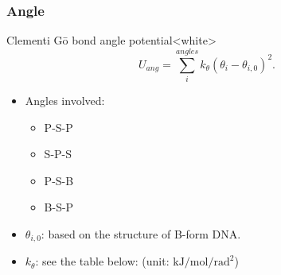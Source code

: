 \subsubsection{Angle}
\label{sec:protein_cc_go_potential_angle}

\begin{smallpage}{Clementi G\={o} bond angle potential}<white>
  \begin{equation}
    \label{eq:protein_cc_go_local_angle}
    U_{ang} = \sum_{i}^{angles} k_\theta (\theta_i - \theta_{i,0})^2.
  \end{equation}
  \tcblower
  \begin{itemize}
  \item Angles involved:
    \begin{itemize}
    \item P-S-P
    \item S-P-S
    \item P-S-B
    \item B-S-P
    \end{itemize}
  \item $\theta_{i, 0}$: based on the structure of B-form DNA.
  \item $k_\theta$: see the table below: (unit: $\mathrm{kJ/mol/rad^2}$)
  \end{itemize}
\end{smallpage}

